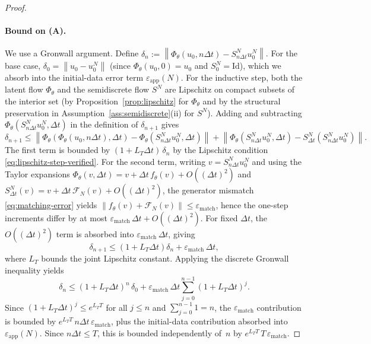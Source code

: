 \documentclass[hidelinks,review,nohypdvips,onefignum,onetabnum]{siamart220329}
\newcommand{\cFN}{\mathcal{F}_N}
\newcommand{\PhiT}{\Phi_{\theta}}
\newcommand{\norm}[1]{\left\lVert #1 \right\rVert}
\begin{document}
\begin{proof}
\paragraph{Bound on (A).} We use a Gronwall argument. Define $\delta_n:=\norm{\PhiT(u_0,n\Delta t)-S_{n\Delta t}^Nu_0^N}$. For the base case, $\delta_0=\norm{u_0-u_0^N}$ (since $\PhiT(u_0,0)=u_0$ and $S_0^N=\mathrm{Id}$), which we absorb into the initial-data error term $\varepsilon_{\mathrm{app}}(N)$. For the inductive step, both the latent flow $\PhiT$ and the semidiscrete flow $S^N$ are Lipschitz on compact subsets of the interior set (by Proposition~\ref{prop:lipschitz} for $\PhiT$ and by the structural preservation in Assumption~\ref{ass:semidiscrete}(ii) for $S^N$). Adding and subtracting $\PhiT(S_{n\Delta t}^Nu_0^N,\Delta t)$ in the definition of $\delta_{n+1}$ gives
\begin{equation*}
\delta_{n+1} \le \norm{\PhiT(\PhiT(u_0,n\Delta t),\Delta t)-\PhiT(S_{n\Delta t}^Nu_0^N,\Delta t)} + \norm{\PhiT(S_{n\Delta t}^Nu_0^N,\Delta t)-S_{\Delta t}^N(S_{n\Delta t}^Nu_0^N)}.
\end{equation*}
The first term is bounded by $(1+L_T\Delta t)\,\delta_n$ by the Lipschitz condition \eqref{eq:lipschitz-step-verified}. For the second term, writing $v=S_{n\Delta t}^Nu_0^N$ and using the Taylor expansions $\PhiT(v,\Delta t)=v+\Delta t\,f_\theta(v)+O((\Delta t)^2)$ and $S_{\Delta t}^N(v)=v+\Delta t\,\cFN(v)+O((\Delta t)^2)$, the generator mismatch \eqref{eq:matching-error} yields $\norm{f_\theta(v)+\cFN(v)}\le\varepsilon_{\mathrm{match}}$, hence the one-step increments differ by at most $\varepsilon_{\mathrm{match}}\,\Delta t+O((\Delta t)^2)$. For fixed $\Delta t$, the $O((\Delta t)^2)$ term is absorbed into $\varepsilon_{\mathrm{match}}\,\Delta t$, giving
\begin{equation*}
\delta_{n+1}\le (1+L_T\Delta t)\delta_n + \varepsilon_{\mathrm{match}}\,\Delta t,
\end{equation*}
where $L_T$ bounds the joint Lipschitz constant. Applying the discrete Gronwall inequality yields
\begin{equation*}
\delta_n \le (1+L_T\Delta t)^n\,\delta_0 + \varepsilon_{\mathrm{match}}\,\Delta t \sum_{j=0}^{n-1}(1+L_T\Delta t)^j.
\end{equation*}
Since $(1+L_T\Delta t)^j\le e^{L_TT}$ for all $j\le n$ and $\sum_{j=0}^{n-1}1=n$, the $\varepsilon_{\mathrm{match}}$ contribution is bounded by $e^{L_TT}\,n\Delta t\,\varepsilon_{\mathrm{match}}$, plus the initial-data contribution absorbed into $\varepsilon_{\mathrm{app}}(N)$. Since $n\Delta t\le T$, this is bounded independently of~$n$ by $e^{L_TT}\,T\,\varepsilon_{\mathrm{match}}$.


\end{proof}
\end{document}
